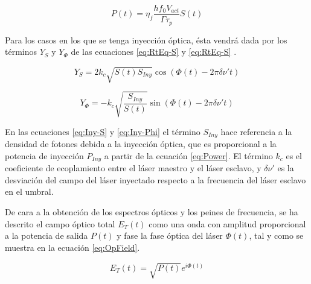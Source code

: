 	\begin{equation}
		P(t) = \eta_f \frac{h f_0 V_{act}}{\Gamma \tau_p} S(t)
		\label{eq:Power}
	\end{equation}

	Para los casos en los que se tenga inyecci\'on \'optica, \'esta vendr\'a dada por los t\'erminos $Y_S$ y $Y_{\Phi}$ de las ecuaciones \ref{eq:RtEq-S} y \ref{eq:RtEq-S} \cite{schunk1986noise}.

	\begin{equation}
		Y_S = 2k_c\sqrt{S(t)S_{Iny}} \cos(\Phi(t) - 2\pi \delta\nu't)
		\label{eq:Iny-S}
	\end{equation}

	\begin{equation}
		Y_{\Phi} = -k_c\sqrt{\frac{S_{Iny}}{S(t)}} \sin(\Phi(t) - 2\pi \delta\nu't)
		\label{eq:Iny-Phi}
	\end{equation}

En las ecuaciones \ref{eq:Iny-S} y \ref{eq:Iny-Phi} el t\'ermino $S_{Iny}$ hace referencia a la densidad de fotones debida a la inyecci\'on \'optica, que es proporcional a la potencia de inyecci\'on $P_{Iny}$ a partir de la ecuación \ref{eq:Power}. El t\'ermino $k_c$ es el coeficiente de ecoplamiento entre el l\'aser maestro y el l\'aser esclavo, y $\delta \nu'$ es la desviaci\'on del campo del l\'aser inyectado respecto a la frecuencia del l\'aser esclavo en el umbral.

De cara a la obtenci\'on de los espectros \'opticos y los peines de frecuencia, se ha descrito el campo \'optico total $E_T(t)$ como una onda con amplitud proporcional a la potencia de salida $P(t)$ y fase la fase \'optica del l\'aser $\Phi(t)$, tal y como se muestra en la ecuaci\'on \ref{eq:OpField}.

	\begin{equation}
		E_T(t) = \sqrt{P(t)} e^{i \Phi(t)}
		\label{eq:OpField}
	\end{equation}
